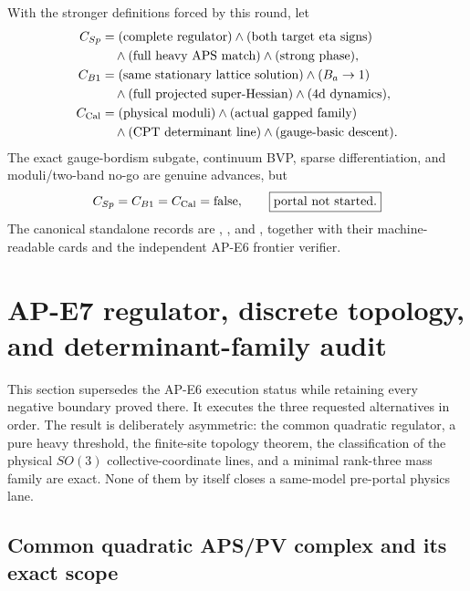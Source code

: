 \documentclass[11pt]{article}
\numberwithin{equation}{section}
\begin{document}
With the stronger definitions forced by this round, let
\begin{align*}
 C_{Sp}&=(\hbox{complete regulator})\wedge(\hbox{both target eta signs})\\
 &\quad\wedge(\hbox{full heavy APS match})\wedge(\hbox{strong phase}),\\
 C_{B1}&=(\hbox{same stationary lattice solution})\wedge(B_a\to1)\\
 &\quad\wedge(\hbox{full projected super-Hessian})
 \wedge(\hbox{4d dynamics}),\\
 C_{\rm Cal}&=(\hbox{physical moduli})\wedge(\hbox{actual gapped family})\\
 &\quad\wedge(\hbox{CPT determinant line})
 \wedge(\hbox{gauge-basic descent}).
\end{align*}
The exact gauge-bordism subgate, continuum BVP, sparse differentiation, and
moduli/two-band no-go are genuine advances, but
\begin{equation}
 C_{Sp}=C_{B1}=C_{\rm Cal}=\mathrm{false},\qquad
 \boxed{\text{portal not started}.}
 \label{eq:e6-final-decision}
\end{equation}
The canonical standalone records are
,
, and
, together with their
machine-readable cards and the independent AP-E6 frontier verifier.

\section{AP-E7 regulator, discrete topology, and determinant-family audit}
\label{sec:ap-e7-audit}

This section supersedes the AP-E6 execution status while retaining every
negative boundary proved there.  It executes the three requested alternatives
in order.  The result is deliberately asymmetric: the common quadratic
regulator, a pure heavy threshold, the finite-site topology theorem, the
classification of the physical \(SO(3)\) collective-coordinate lines, and a
minimal rank-three mass family are exact.  None of them by itself closes a
same-model pre-portal physics lane.

\subsection{Common quadratic APS/PV complex and its exact scope}
\end{document}
